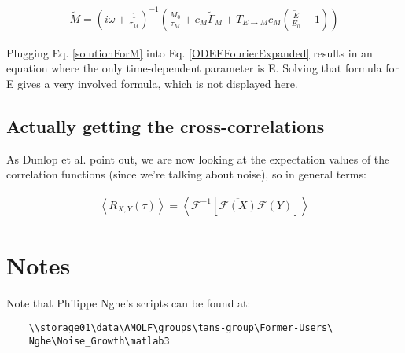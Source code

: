 \documentclass[a4paper,twoside,10pt]{report}
\begin{document}
\begin{align}
\label{solutionForM}
\tilde{M} = \left( i \omega + \frac{1}{\tau_M} \right)^{-1} \left( \frac{M_0}{\tau_M} + c_M \tilde{\Gamma}_M + T_{E \rightarrow M} c_M (\frac{\tilde{E}}{E_0} - 1) \right)
\end{align}

Plugging Eq. \ref{solutionForM} into Eq. \ref{ODEEFourierExpanded} results in an equation where the only time-dependent parameter is E.
Solving that formula for E gives a very involved formula, which is not displayed here.

\subsection{Actually getting the cross-correlations}

As Dunlop et al. point out, we are now looking at the expectation values of the correlation functions (since we're talking about noise), so in general terms:

\begin{align}
\left< R_{X,Y}(\tau)\right > = 
\left< \mathcal{F}^{-1} \left[ \overline{\mathcal{F} (X)} \mathcal{F}(Y) \right] \right>
\end{align}



\section{Notes}

Note that Philippe Nghe's scripts can be found at:

\begin{verbatim}
    \\storage01\data\AMOLF\groups\tans-group\Former-Users\
    Nghe\Noise_Growth\matlab3
\end{verbatim}





\addtocontents{toc}{\protect\vspace*{\baselineskip}}


\end{document}
